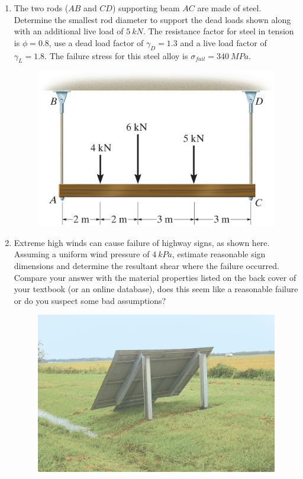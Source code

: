 \documentclass[12pt, oneside]{article}
\begin{document}
\begin{enumerate}
	\item %
		The two rods ($AB$ and $CD$) supporting beam $AC$ are made of steel.
		Determine the smallest rod diameter to support the dead loads shown along with an additional live load of $\SI{5}{kN}$.
		The resistance factor for steel in tension is $\phi=0.8$, use a dead load factor of $\gamma_D = 1.3$ and a live load factor of $\gamma_L = 1.8$.
		The failure stress for this steel alloy is $\sigma_{fail} = \SI{340}{MPa}$.
		\begin{figure}[H]
			\centering
			\includegraphics[width=0.6\linewidth]{hangingbeam}
			\label{fig:hangingbeam}
		\end{figure}

	\item %
		Extreme high winds can cause failure of highway signs, as shown here.
		Assuming a uniform wind pressure of $\SI{4}{kPa}$, estimate reasonable sign dimensions and determine the resultant shear where the failure occurred.
		Compare your answer with the material properties listed on the back cover of your textbook (or an online database), does this seem like a reasonable failure or do you suspect some bad assumptions?
		\begin{figure}[H]
			\centering
			\includegraphics[width=0.6\linewidth]{sign}
			\label{fig:sign}
		\end{figure}
		\pagebreak


\end{enumerate}
\end{document}
